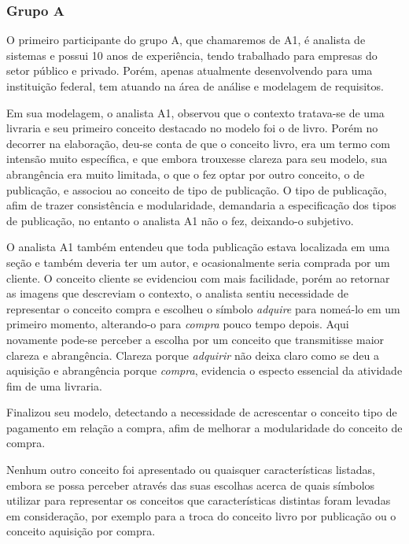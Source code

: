 \subsubsection{\hspace*{3pt} Grupo A}

O primeiro participante do grupo A, que chamaremos de A1, é analista de sistemas e possui 10 anos de experiência, tendo trabalhado para empresas do setor público e privado. Porém, apenas atualmente desenvolvendo para uma instituição federal, tem atuando na área de análise e modelagem de requisitos.

Em sua modelagem, o analista A1, observou que o contexto tratava-se de uma livraria e seu primeiro conceito destacado no modelo foi o de livro. Porém no decorrer na elaboração, deu-se conta de que o conceito livro, era um termo com intensão muito específica, e que embora trouxesse clareza para seu modelo, sua abrangência era muito limitada, o que o fez optar por outro conceito, o de publicação, e associou ao conceito de tipo de publicação. O tipo de publicação, afim de trazer consistência e modularidade, demandaria a especificação dos tipos de publicação, no entanto o analista A1 não o fez, deixando-o subjetivo. 

O analista A1 também entendeu que toda publicação estava localizada em uma seção e também deveria ter um autor, e ocasionalmente seria comprada por um cliente. O conceito cliente se evidenciou com mais facilidade, porém ao retornar as imagens que descreviam o contexto, o analista sentiu necessidade de representar o conceito compra e escolheu o símbolo \textit{adquire} para  nomeá-lo em um primeiro momento, alterando-o para \textit{compra} pouco tempo depois. Aqui novamente pode-se perceber a escolha por um conceito que transmitisse maior clareza e abrangência. Clareza porque \textit{adquirir} não deixa claro como se deu a aquisição e abrangência porque \textit{compra}, evidencia o especto essencial da atividade fim de uma livraria.

Finalizou seu modelo, detectando a necessidade de acrescentar o conceito tipo de pagamento em relação a compra, afim de melhorar a modularidade do conceito de compra. 

Nenhum outro conceito foi apresentado ou quaisquer características listadas, embora se possa perceber através das suas escolhas acerca de quais símbolos utilizar para representar os conceitos que características distintas foram levadas em consideração, por exemplo para a troca do conceito livro por publicação ou o conceito aquisição por compra.

